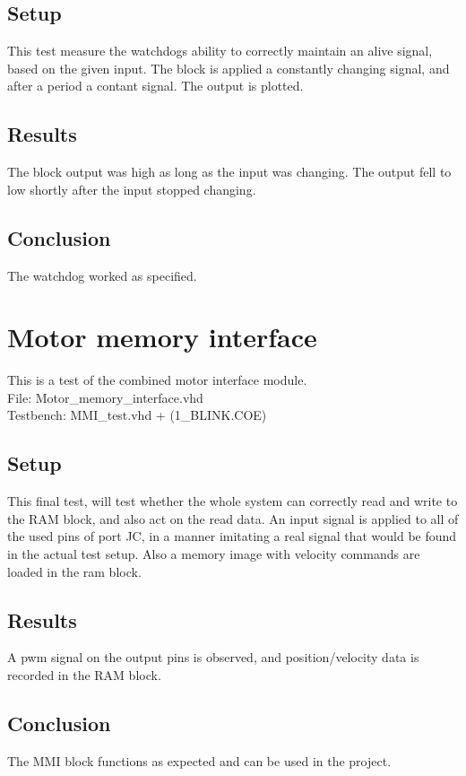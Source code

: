\subsection*{Setup}
This test measure the watchdogs ability to correctly maintain an alive signal, based on the given input.
The block is applied a constantly changing signal, and after a period a contant signal. The output is plotted.
\subsection*{Results}
The block output was high as long as the input was changing. The output fell to low shortly after the input stopped changing.
\subsection*{Conclusion}
The watchdog worked as specified.

\section{Motor memory interface}
This is a test of the combined motor interface module.\\
File: Motor\_memory\_interface.vhd\\
Testbench: MMI\_test.vhd + (1\_BLINK.COE)
\subsection*{Setup}
This final test, will test whether the whole system can correctly read and write to the RAM block, and also act on the read data.
An input signal is applied to all of the used pins of port JC, in a manner imitating a real signal that would be found in the actual test setup. Also a memory image with velocity commands are loaded in the ram block.

\subsection*{Results}
A pwm signal on the output pins is observed, and position/velocity data is recorded in the RAM block.
\subsection*{Conclusion}
The MMI block functions as expected and can be used in the project.
